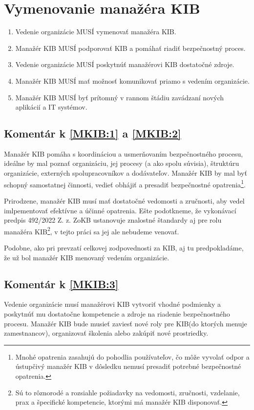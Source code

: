 \section{Vymenovanie manažéra KIB}
\begin{enumerate}
  \item \label{MKIB:1} Vedenie organizácie MUSÍ vymenovať manažéra KIB.
  \item \label{MKIB:2} Manažér KIB MUSÍ podporovať KIB a pomáhať riadiť bezpečnostný proces.
  \item \label{MKIB:3} Vedenie organizácie MUSÍ poskytnúť manažérovi KIB dostatočné zdroje.
  \item \label{MKIB:4} Manažér KIB MUSÍ mať možnosť komunikovať priamo s vedením organizácie.
  \item \label{MKIB:5} Manažér KIB MUSÍ byť prítomný v rannom štádiu zavádzaní nových aplikácií a IT systémov.
\end{enumerate}

\subsection*{Komentár k \ref{MKIB:1} a \ref{MKIB:2}}
Manažér KIB pomáha s koordináciou a usmerňovaním bezpečnostného procesu, ideálne by mal poznať organizáciu, jej procesy
(a ako spolu súvisia), štruktúru organizácie, externých spolupracovníkov a dodávateľov. Manažér KIB by mal byť schopný samostatnej
činnosti, vedieť obhájiť a presadiť bezpečnostné opatrenia\footnote{Mnohé opatrenia zasahujú do pohodlia používateľov, čo
môže vyvolať odpor a ústupčivý manažér KIB v dôsledku nemusí presadiť potrebné bezpečnostné opatrenia.}.

Prirodzene, manažér KIB musí mať dostatočné vedomosti a zručnosti, aby vedel imlpementovať efektívne a účinné opatrenia.
Ešte podotkneme, že vykonávací predpis 492/2022 Z. z. \acrshort{ZoKB} ustanovuje znalostné štandardy aj pre rolu manažéra
KIB\footnote{Sú to rôznorodé a rozsiahle požiadavky na vedomosti, zručnosti, vzdelanie, prax a špecifické kompetencie,
ktorými má manažér KIB disponovať.}, v tejto práci sa jej ale nebudeme venovať.

Podobne, ako pri prevzatí celkovej zodpovednosti za KIB, aj tu predpokladáme, že už bol manažér KIB menovaný vedením organizácie.

\subsection*{Komentár k \ref{MKIB:3}}
Vedenie organizácie musí manažérovi KIB vytvoriť vhodné podmienky a poskytnúť mu dostatočne kompetencie a zdroje na riadenie
bezpečnostného procesu. Manažér KIB bude musieť zaviesť nové roly pre KIB(do ktorých menuje zamestnancov), organizovať školenia
alebo zakúpiť nové prostriedky.

